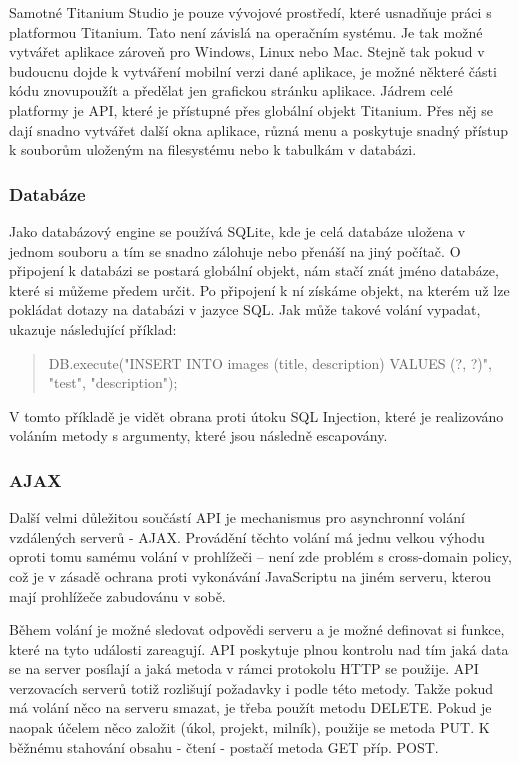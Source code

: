 Samotné Titanium Studio je pouze vývojové prostředí, které usnadňuje práci s platformou Titanium. Tato není závislá na operačním systému. Je tak možné vytvářet aplikace zároveň pro Windows, Linux nebo Mac. Stejně tak pokud v budoucnu dojde k vytváření mobilní verzi dané aplikace, je možné některé části kódu znovupoužít a předělat jen grafickou stránku aplikace. Jádrem celé platformy je API, které je přístupné přes globální objekt Titanium. Přes něj se dají snadno vytvářet další okna aplikace, různá menu a poskytuje snadný přístup k souborům uloženým na filesystému nebo k tabulkám v databázi. 

\subsubsection{Databáze}

Jako databázový engine se používá SQLite\cite{sqlite}, kde je celá databáze uložena v jednom souboru a tím se snadno zálohuje nebo přenáší na jiný počítač. O připojení k databázi se postará globální objekt, nám stačí znát jméno databáze, které si můžeme předem určit. Po připojení k ní získáme objekt, na kterém už lze pokládat dotazy na databázi v jazyce SQL. Jak může takové volání vypadat, ukazuje následující příklad:

\begin{quote}
DB.execute("INSERT INTO images (title, description) VALUES (?, ?)", "test", "description");
\end{quote}

V tomto příkladě je vidět obrana proti útoku SQL Injection, které je realizováno voláním metody s argumenty, které jsou následně escapovány.

\subsubsection{AJAX}

Další velmi důležitou součástí API je mechanismus pro asynchronní volání vzdálených serverů - AJAX. Provádění těchto volání má jednu velkou výhodu oproti tomu samému volání v prohlížeči – není zde problém s cross-domain policy\cite{sameorigin}, což je v zásadě ochrana proti vykonávání JavaScriptu na jiném serveru, kterou mají prohlížeče zabudovánu v sobě. 

Během volání je možné sledovat odpovědi serveru a je možné definovat si funkce, které na tyto události zareagují. API poskytuje plnou kontrolu nad tím jaká data se na server posílají a jaká metoda v rámci protokolu HTTP se použije. API verzovacích serverů totiž rozlišují požadavky i podle této metody. Takže pokud má volání něco na serveru smazat, je třeba použít metodu DELETE. Pokud je naopak účelem něco založit (úkol, projekt, milník), použije se metoda PUT. K běžnému stahování obsahu - čtení - postačí metoda GET příp. POST.

